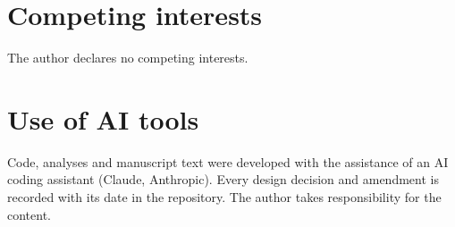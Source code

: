 \documentclass[11pt]{article}
\begin{document}
\section*{Competing interests}
The author declares no competing interests.

\section*{Use of AI tools}
Code, analyses and manuscript text were developed with the assistance of an AI coding assistant
(Claude, Anthropic). Every design decision and amendment is recorded with its date in the
repository. The author takes responsibility for the content.



\end{document}
